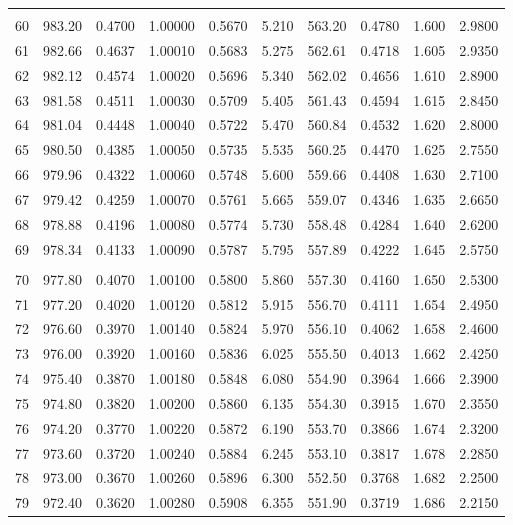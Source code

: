 \documentclass[letter,twosides,10pt]{article}
\begin{document}
\begin{longtable}{|c|c|c|c|c|c|c|c|c|c|}
 & & & & & & & & & \\ 
 60 & 983.20 & 0.4700 & 1.00000 & 0.5670 &  5.210 & 563.20 & 0.4780 & 1.600 &  2.9800 \\
 61 & 982.66 & 0.4637 & 1.00010 & 0.5683 &  5.275 & 562.61 & 0.4718 & 1.605 &  2.9350 \\
 62 & 982.12 & 0.4574 & 1.00020 & 0.5696 &  5.340 & 562.02 & 0.4656 & 1.610 &  2.8900 \\
 63 & 981.58 & 0.4511 & 1.00030 & 0.5709 &  5.405 & 561.43 & 0.4594 & 1.615 &  2.8450 \\
 64 & 981.04 & 0.4448 & 1.00040 & 0.5722 &  5.470 & 560.84 & 0.4532 & 1.620 &  2.8000 \\
 65 & 980.50 & 0.4385 & 1.00050 & 0.5735 &  5.535 & 560.25 & 0.4470 & 1.625 &  2.7550 \\
 66 & 979.96 & 0.4322 & 1.00060 & 0.5748 &  5.600 & 559.66 & 0.4408 & 1.630 &  2.7100 \\
 67 & 979.42 & 0.4259 & 1.00070 & 0.5761 &  5.665 & 559.07 & 0.4346 & 1.635 &  2.6650 \\
 68 & 978.88 & 0.4196 & 1.00080 & 0.5774 &  5.730 & 558.48 & 0.4284 & 1.640 &  2.6200 \\
 69 & 978.34 & 0.4133 & 1.00090 & 0.5787 &  5.795 & 557.89 & 0.4222 & 1.645 &  2.5750 \\
 & & & & & & & & & \\ 
 70 & 977.80 & 0.4070 & 1.00100 & 0.5800 &  5.860 & 557.30 & 0.4160 & 1.650 &  2.5300 \\
 71 & 977.20 & 0.4020 & 1.00120 & 0.5812 &  5.915 & 556.70 & 0.4111 & 1.654 &  2.4950 \\
 72 & 976.60 & 0.3970 & 1.00140 & 0.5824 &  5.970 & 556.10 & 0.4062 & 1.658 &  2.4600 \\
 73 & 976.00 & 0.3920 & 1.00160 & 0.5836 &  6.025 & 555.50 & 0.4013 & 1.662 &  2.4250 \\
 74 & 975.40 & 0.3870 & 1.00180 & 0.5848 &  6.080 & 554.90 & 0.3964 & 1.666 &  2.3900 \\
 75 & 974.80 & 0.3820 & 1.00200 & 0.5860 &  6.135 & 554.30 & 0.3915 & 1.670 &  2.3550 \\
 76 & 974.20 & 0.3770 & 1.00220 & 0.5872 &  6.190 & 553.70 & 0.3866 & 1.674 &  2.3200 \\
 77 & 973.60 & 0.3720 & 1.00240 & 0.5884 &  6.245 & 553.10 & 0.3817 & 1.678 &  2.2850 \\
 78 & 973.00 & 0.3670 & 1.00260 & 0.5896 &  6.300 & 552.50 & 0.3768 & 1.682 &  2.2500 \\
 79 & 972.40 & 0.3620 & 1.00280 & 0.5908 &  6.355 & 551.90 & 0.3719 & 1.686 &  2.2150 \\

\end{longtable}
\end{document}
